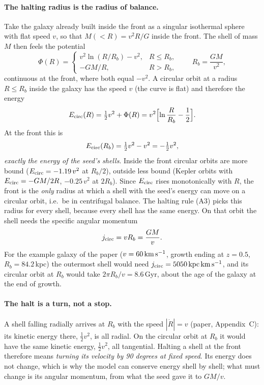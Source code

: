 \documentclass[11pt,a4paper]{article}
\begin{document}
\paragraph{The halting radius is the radius of balance.} Take the galaxy already
built inside the front as a singular isothermal sphere with flat speed $v$, so that
$M(<R)=v^2R/G$ inside the front. The shell of mass $M$ then feels the potential
\begin{equation}
  \Phi(R)=\begin{cases}
  v^2\ln(R/R_b)-v^2, & R\le R_b,\\
  -GM/R, & R>R_b,
  \end{cases}
  \qquad R_b=\frac{GM}{v^2},
  \label{eq:phi}
\end{equation}
continuous at the front, where both equal $-v^2$. A circular orbit at a radius
$R\le R_b$ inside the galaxy has the speed $v$ (the curve is flat) and therefore the
energy
\begin{equation}
  E_{\rm circ}(R)=\tfrac12v^2+\Phi(R)=v^2\Bigl[\ln\frac{R}{R_b}-\frac12\Bigr].
  \label{eq:ecirc}
\end{equation}
At the front this is
\begin{equation}
  E_{\rm circ}(R_b)=\tfrac12v^2-v^2=-\tfrac12v^2,
\end{equation}
\emph{exactly the energy of the seed's shells}. Inside the front circular orbits are
more bound ($E_{\rm circ}=-1.19\,v^2$ at $R_b/2$), outside less bound (Kepler orbits
with $E_{\rm circ}=-GM/2R$, $-0.25\,v^2$ at $2R_b$). Since $E_{\rm circ}$ rises
monotonically with $R$, the front is the \emph{only} radius at which a shell with
the seed's energy can move on a circular orbit, i.e.\ be in centrifugal balance. The
halting rule (A3) picks this radius for every shell, because every shell has the
same energy. On that orbit the shell needs the specific angular momentum
\begin{equation}
  j_{\rm circ}=vR_b=\frac{GM}{v}.
  \label{eq:jcircRb}
\end{equation}
For the example galaxy of the paper ($v=60\,{\rm km\,s^{-1}}$, growth ending at
$z=0.5$, $R_b=84.2$\,kpc) the outermost shell would need
$j_{\rm circ}=5050\,{\rm kpc\,km\,s^{-1}}$, and its circular orbit at $R_b$ would take
$2\pi R_b/v=8.6$\,Gyr, about the age of the galaxy at the end of growth.

\paragraph{The halt is a turn, not a stop.} A shell falling radially arrives at $R_b$
with the speed $|\dot R|=v$ (paper, Appendix~C): its kinetic energy there,
$\tfrac12v^2$, is all radial. On the circular orbit at $R_b$ it would have the same
kinetic energy, $\tfrac12v^2$, all tangential. Halting a shell at the front
therefore means \emph{turning its velocity by 90 degrees at fixed speed}. Its energy
does not change, which is why the model can conserve energy shell by shell; what
must change is its angular momentum, from what the seed gave it to $GM/v$.
\end{document}

